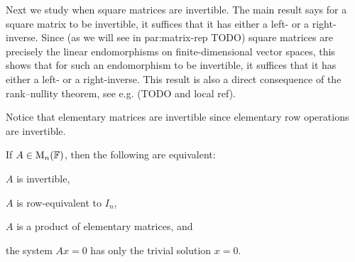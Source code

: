 Next we study when square matrices are invertible. The main result says for a square matrix to be invertible, it suffices that it has either a left- or a right-inverse. Since (as we will see in {par:matrix-rep} TODO) square matrices are precisely the linear endomorphisms on finite-dimensional vector spaces, this shows that for such an endomorphism to be invertible, it suffices that it has either a left- or a right-inverse. This result is also a direct consequence of the rank--nullity theorem, see e.g. \textcite[Corollary~2.9]{romanlinalg} (TODO and local ref).

Notice that elementary matrices are invertible since elementary row operations are invertible.

\begin{lemma}
    If $A \in \mathrm{M}_{n}(\mathbb{F})$, then the following are equivalent:
    \begin{enumlemma}
        \item \label{enum:lemma-A-invertible} $A$ is invertible,
        \item \label{enum:lemma-A-equivalent-to-I} $A$ is row-equivalent to $I_n$,
        \item \label{enum:lemma-A-elementary-matrix-product} $A$ is a product of elementary matrices, and
        \item \label{enum:lemma-only-trivial-solution} the system $Ax = 0$ has only the trivial solution $x = 0$.
    \end{enumlemma}
\end{lemma}

